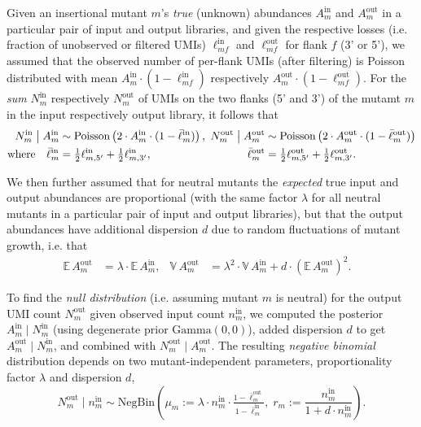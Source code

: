 \documentclass[a4paper,11pt,oneside]{amsart}
\begin{document}
Given an insertional mutant $m$'s \emph{true} (unknown) abundances $A^\text{in}_{m}$ and $A^\text{out}_{m}$ in a particular pair of input and output libraries, and given the respective losses (i.e. fraction of unobserved or filtered UMIs) $\ell^\text{in}_{mf}$ and $\ell^\text{out}_{mf}$ for flank $f$ (3' or 5'), we assumed that the observed number of per-flank UMIs (after filtering) is Poisson distributed with mean $A^\text{in}_{m}\cdot(1-\ell^\text{in}_{mf})$ respectively $A^\text{out}_{m}\cdot(1-\ell^\text{out}_{mf})$.  For the \emph{sum} $N^\text{in}_m$ respectively $N^\text{out}_m$ of UMIs on the two flanks (5' and 3') of the mutamt $m$ in the input respectively output library, it follows that
\begin{align}\label{eq-model}
  N^\text{in}_m\;\big|\;A^\text{in}_{m} &\sim \text{Poisson}\left(
    2\cdot A^\text{in}_{m}\cdot (1-\bar\ell^\text{in}_m)\right), &
  \hspace{-5pt}
  N^\text{out}_m\;\big|\;A^\text{out}_{m} &\sim \text{Poisson}\left(
    2\cdot A^\text{out}_{m}\cdot (1-\bar\ell^\text{out}_m)\right) \\
  \text{where}\quad
  \bar\ell^\text{in}_m &= \tfrac{1}{2}\ell^\text{in}_{m,5'} + \tfrac{1}{2}\ell^\text{in}_{m,3'}, &
  \bar\ell^\text{out}_m &= \tfrac{1}{2}\ell^\text{out}_{m,5'} + \tfrac{1}{2}\ell^\text{out}_{m,3'}. \nonumber
\end{align} 

We then further assumed that for neutral mutants the \emph{expected} true input and output abundances are proportional (with the same factor $\lambda$ for all neutral mutants in a particular pair of input and output libraries), but that the output abundances have additional dispersion $d$ due to random fluctuations of mutant growth, i.e. that
\begin{align}\label{eq-a_out}
  \mathbb{E}\, A^\text{out}_m &= \lambda\cdot \mathbb{E}\, A^\text{in}_m, &
  \mathbb{V}\, A^\text{out}_m &= \lambda^2\cdot \mathbb{V}\, A^\text{in}_m + d\cdot\left(\mathbb{E}\, A^\text{out}_m\right)^2.&
\end{align}

To find the \emph{null distribution} (i.e. assuming mutant $m$ is neutral) for the output UMI count $N^\text{out}_m$ given observed input count $n^\text{in}_m$, we computed the posterior $A^\text{in}_{m}\;|\;N^\text{in}_m$ (using degenerate prior $\text{Gamma}(0,0)$), added dispersion $d$ to get $A^\text{out}_{m}\;|\;N^\text{in}_m$, and combined with $N^\text{out}_m\;\big|\;A^\text{out}_{m}$. The resulting \emph{negative binomial} distribution depends on two mutant-independent parameters, proportionality factor $\lambda$ and dispersion $d$,
\begin{equation}\label{eq-n_out-dist}
  N^\text{out}_m\;\big|\;n^\text{in}_{m} \sim
  \text{NegBin}\left(\mu_m := \lambda\cdot n^\text{in}_{m}\cdot\tfrac{1-\bar\ell^\text{out}_m}{1-\bar\ell^\text{in}_m},\;
                     r_m := \frac{n^\text{in}_{m}}{1 + d\cdot n^\text{in}_{m}}\right).
\end{equation}
\end{document}
